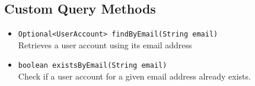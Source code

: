 \documentclass[12pt]{article}
\begin{document}
\subsection*{Custom Query Methods}
\begin{itemize}
    \item \texttt{Optional<UserAccount> findByEmail(String email)} \\
    Retrieves a user account using its email address


    \item \texttt{boolean existsByEmail(String email)} \\
    Check if a user account for a given email address already exists.


\end{itemize}
\end{document}
